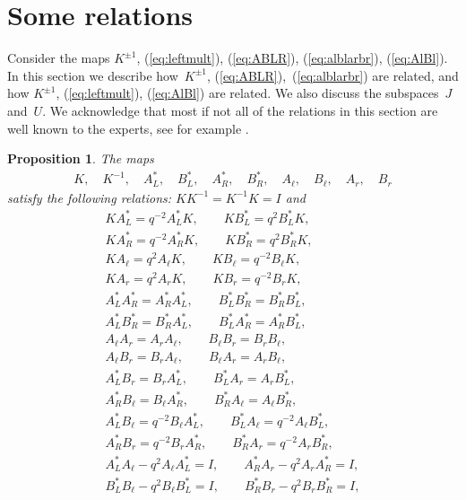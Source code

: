 \documentclass[pdftex]{sigma}
\numberwithin{equation}{section}
\newtheorem{Proposition}[Theorem]{Proposition}
 { \theoremstyle{definition}
\newtheorem{Definition}[Theorem]{Definition}
\newtheorem{Example}[Theorem]{Example}
\newtheorem{Note}[Theorem]{Note}
}
\begin{document}
\section{Some relations}\label{section9}

Consider the maps $K^{\pm 1}$, (\ref{eq:leftmult}), (\ref{eq:ABLR}), (\ref{eq:alblarbr}), (\ref{eq:AlBl}). In this section we describe how~$K^{\pm 1}$, (\ref{eq:ABLR}),~(\ref{eq:alblarbr}) are related, and how $K^{\pm 1}$, (\ref{eq:leftmult}), (\ref{eq:AlBl}) are related. We also discuss the subspaces~$J$ and~$U$.
We acknowledge that most if not all of the relations in this section are well known to the experts, see for example
\cite[Sections~3.3 and 3.4]{kashiwara}.
\begin{Proposition}\label{thm:v1} The maps
\begin{gather}\label{eq:maplist1}
K, \quad K^{-1},\quad A^*_L,
\quad
B^*_L,
\quad
A^*_R,
\quad
B^*_R,
\quad
A_\ell,
\quad
B_\ell,
\quad
A_r,
\quad
B_r
\end{gather}
satisfy the following relations: $K K^{-1} = K^{-1}K = I$ and
\begin{gather*}
K A^*_L = q^{-2} A^*_L K,\qquad K B^*_L = q^2 B^*_L K,\\
K A^*_R = q^{-2} A^*_R K,\qquad K B^*_R = q^{2} B^*_R K,\\
K A_\ell = q^{2} A_\ell K,\qquad K B_\ell = q^{-2} B_\ell K,\\
K A_r = q^{2} A_r K,\qquad K B_r = q^{-2} B_r K,\\
A^*_L A^*_R = A^*_R A^*_L, \qquad B^*_L B^*_R = B^*_R B^*_L,\\
A^*_L B^*_R = B^*_R A^*_L, \qquad B^*_L A^*_R = A^*_R B^*_L,\\
A_\ell A_r = A_r A_\ell, \qquad B_\ell B_r = B_r B_\ell,\\
A_\ell B_r = B_r A_\ell, \qquad B_\ell A_r = A_r B_\ell,\\
A^*_L B_r = B_r A^*_L, \qquad B^*_L A_r = A_r B^*_L,\\
 A^*_R B_\ell = B_\ell A^*_R, \qquad B^*_R A_\ell = A_\ell B^*_R,\\
A^*_L B_\ell = q^{-2} B_\ell A^*_L, \qquad B^*_L A_\ell = q^{-2} A_\ell B^*_L,\\
A^*_R B_r = q^{-2} B_r A^*_R, \qquad B^*_R A_r = q^{-2} A_r B^*_R,\\
 A^*_L A_\ell - q^2 A_{\ell} A^*_L = I, \qquad A^*_R A_r - q^2 A_r A^*_R = I,\\
 B^*_L B_\ell - q^2 B_{\ell} B^*_L = I,\qquad B^*_R B_r - q^2 B_r B^*_R = I,\\

\end{gather*}
\end{Proposition}
\end{document}
